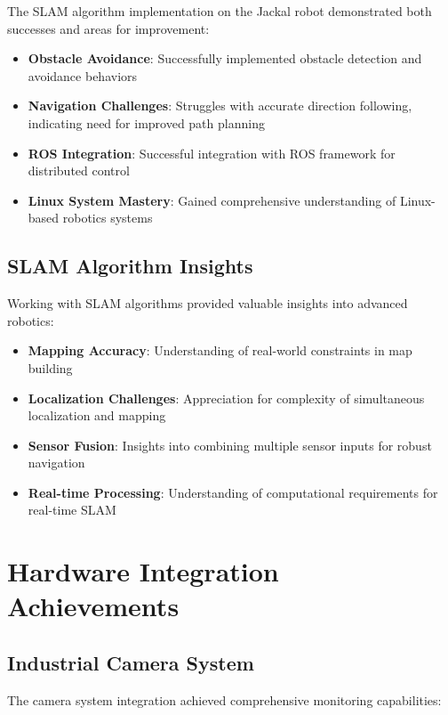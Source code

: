 \documentclass{book}
\begin{document}
\par\noindent The SLAM algorithm implementation on the Jackal robot demonstrated both successes and areas for improvement:

\begin{itemize}
\item \textbf{Obstacle Avoidance}: Successfully implemented obstacle detection and avoidance behaviors
\item \textbf{Navigation Challenges}: Struggles with accurate direction following, indicating need for improved path planning
\item \textbf{ROS Integration}: Successful integration with ROS framework for distributed control
\item \textbf{Linux System Mastery}: Gained comprehensive understanding of Linux-based robotics systems
\end{itemize}

\subsection{SLAM Algorithm Insights}

\par\noindent Working with SLAM algorithms provided valuable insights into advanced robotics:

\begin{itemize}
\item \textbf{Mapping Accuracy}: Understanding of real-world constraints in map building
\item \textbf{Localization Challenges}: Appreciation for complexity of simultaneous localization and mapping
\item \textbf{Sensor Fusion}: Insights into combining multiple sensor inputs for robust navigation
\item \textbf{Real-time Processing}: Understanding of computational requirements for real-time SLAM
\end{itemize}

\section{Hardware Integration Achievements}

\subsection{Industrial Camera System}

\par\noindent The camera system integration achieved comprehensive monitoring capabilities:
\end{document}
